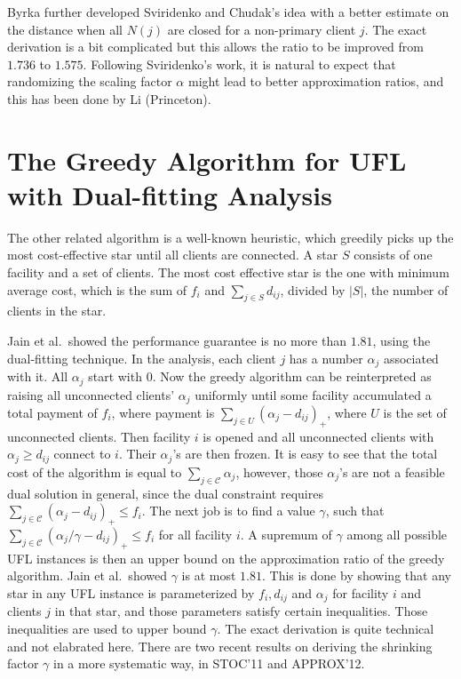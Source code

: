 \documentclass[11pt]{article}
\newcommand{\cli}{\mathcal{C}}
\newcommand{\etal}{et al.\ }
\begin{document}
Byrka further developed Sviridenko and Chudak's idea with a better
estimate on the distance when all $N(j)$ are closed for a non-primary
client $j$. The exact derivation is a bit complicated but this allows
the ratio to be improved from $1.736$ to $1.575$. Following
Sviridenko's work, it is natural to expect that randomizing the
scaling factor $\alpha$ might lead to better approximation ratios, and
this has been done by Li (Princeton).

\section{The Greedy Algorithm for UFL with Dual-fitting Analysis}
The other related algorithm is a well-known heuristic, which greedily
picks up the most cost-effective star until all clients are
connected. A star $S$ consists of one facility and a set of
clients. The most cost effective star is the one with minimum average
cost, which is the sum of $f_i$ and $\sum_{j\in S} d_{ij}$, divided by
$|S|$, the number of clients in the star. 

Jain \etal showed the performance guarantee is no more than $1.81$,
using the dual-fitting technique. In the analysis, each client $j$ has
a number $\alpha_j$ associated with it. All $\alpha_j$ start with
$0$. Now the greedy algorithm can be reinterpreted as raising all
unconnected clients' $\alpha_j$ uniformly until some facility
accumulated a total payment of $f_i$, where payment is $\sum_{j\in U}
(\alpha_j - d_{ij})_+$, where $U$ is the set of unconnected
clients. Then facility $i$ is opened and all unconnected clients with
$\alpha_j \geq d_{ij}$ connect to $i$. Their $\alpha_j$'s are then
frozen. It is easy to see that the total cost of the algorithm is
equal to $\sum_{j\in\cli} \alpha_j$, however, those $\alpha_j$'s are
not a feasible dual solution in general, since the dual constraint
requires $\sum_{j\in \cli} (\alpha_j - d_{ij})_+ \leq f_i$. The next
job is to find a value $\gamma$, such that $\sum_{j\in \cli} (\alpha_j
/ \gamma - d_{ij})_+ \leq f_i$ for all facility $i$. A supremum of
$\gamma$ among all possible UFL instances is then an upper bound on
the approximation ratio of the greedy algorithm. Jain \etal showed
$\gamma$ is at most $1.81$. This is done by showing that any star in
any UFL instance is parameterized by $f_i, d_{ij}$ and $\alpha_j$ for
facility $i$ and clients $j$ in that star, and those parameters
satisfy certain inequalities. Those inequalities are used to upper
bound $\gamma$. The exact derivation is quite technical and not
elabrated here. There are two recent results on deriving the shrinking
factor $\gamma$ in a more systematic way, in STOC'11 and APPROX'12.
\end{document}
